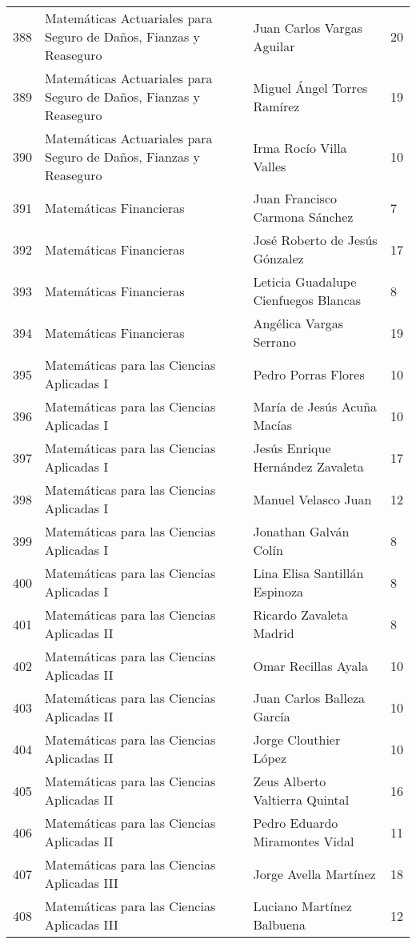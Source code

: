 \begin{table}[ht]
\begin{tabular}{rlll}
  388 & Matemáticas Actuariales para Seguro de Daños, Fianzas y Reaseguro & Juan Carlos Vargas Aguilar & 20 \\ 
  389 & Matemáticas Actuariales para Seguro de Daños, Fianzas y Reaseguro & Miguel Ángel Torres Ramírez & 19 \\ 
  390 & Matemáticas Actuariales para Seguro de Daños, Fianzas y Reaseguro & Irma Rocío Villa Valles & 10 \\ 
  391 & Matemáticas Financieras & Juan Francisco Carmona Sánchez & 7 \\ 
  392 & Matemáticas Financieras & José Roberto de Jesús Gónzalez & 17 \\ 
  393 & Matemáticas Financieras & Leticia Guadalupe Cienfuegos Blancas & 8 \\ 
  394 & Matemáticas Financieras & Angélica Vargas Serrano & 19 \\ 
  395 & Matemáticas para las Ciencias Aplicadas I & Pedro Porras Flores & 10 \\ 
  396 & Matemáticas para las Ciencias Aplicadas I & María de Jesús Acuña Macías & 10 \\ 
  397 & Matemáticas para las Ciencias Aplicadas I & Jesús Enrique Hernández Zavaleta & 17 \\ 
  398 & Matemáticas para las Ciencias Aplicadas I & Manuel Velasco Juan & 12 \\ 
  399 & Matemáticas para las Ciencias Aplicadas I & Jonathan Galván Colín & 8 \\ 
  400 & Matemáticas para las Ciencias Aplicadas I & Lina Elisa Santillán Espinoza & 8 \\ 
  401 & Matemáticas para las Ciencias Aplicadas II & Ricardo Zavaleta Madrid & 8 \\ 
  402 & Matemáticas para las Ciencias Aplicadas II & Omar Recillas Ayala & 10 \\ 
  403 & Matemáticas para las Ciencias Aplicadas II & Juan Carlos Balleza García & 10 \\ 
  404 & Matemáticas para las Ciencias Aplicadas II & Jorge Clouthier López & 10 \\ 
  405 & Matemáticas para las Ciencias Aplicadas II & Zeus Alberto Valtierra Quintal & 16 \\ 
  406 & Matemáticas para las Ciencias Aplicadas II & Pedro Eduardo Miramontes Vidal & 11 \\ 
  407 & Matemáticas para las Ciencias Aplicadas III & Jorge Avella Martínez & 18 \\ 
  408 & Matemáticas para las Ciencias Aplicadas III & Luciano Martínez Balbuena & 12 \\ 

\end{tabular}
\end{table}
